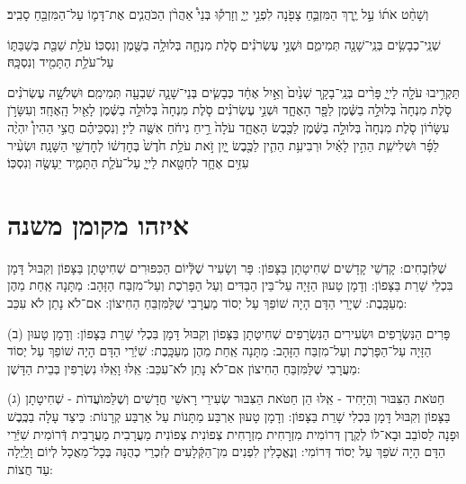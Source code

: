  וְשָׁחַ֨ט  אֹת֜וֹ עַ֣ל יֶ֧רֶךְ הַמִּזְבֵּ֛חַ צָפֹ֖נָה לִפְנֵ֣י יְיָ֑ וְזָרְק֡וּ בְּנֵי֩ אַהֲרֹ֨ן הַכֹּהֲנִ֧ים אֶת־דָּמ֛וֹ עַל־הַמִּזְבֵּ֖חַ סָבִֽיב׃ 
 
 שְׁנֵֽי־כְבָשִׂ֥ים בְּנֵֽי־שָׁנָ֖ה תְּמִימִ֑ם וּשְׁנֵ֣י עֶשְׂרֹנִ֗ים סֹ֧לֶת מִנְחָ֛ה בְּלוּלָ֥ה בַשֶּׁ֖מֶן וְנִסְכּֽוֹ׃ 
 עֹלַ֥ת שַׁבַּ֖ת בְּשַׁבַּתּ֑וֹ עַל־עֹלַ֥ת הַתָּמִ֖יד וְנִסְכָּֽהּ׃ 
 
 
תַּקְרִ֥יבוּ עֹלָ֖ה לַייָ֑ פָּרִ֨ים בְּנֵֽי־בָקָ֤ר שְׁנַ֙יִם֙ וְאַ֣יִל אֶחָ֔ד כְּבָשִׂ֧ים בְּנֵי־שָׁנָ֛ה שִׁבְעָ֖ה תְּמִימִֽם׃ 
וּשְׁלֹשָׁ֣ה עֶשְׂרֹנִ֗ים סֹ֤לֶת מִנְחָה֙ בְּלוּלָ֣ה בַשֶּׁ֔מֶן לַפָּ֖ר הָאֶחָ֑ד וּשְׁנֵ֣י עֶשְׂרֹנִ֗ים סֹ֤לֶת מִנְחָה֙ בְּלוּלָ֣ה בַשֶּׁ֔מֶן לָאַ֖יִל הָֽאֶחָֽד׃ 
וְעִשָּׂרֹ֣ן עִשָּׂר֗וֹן סֹ֤לֶת מִנְחָה֙ בְּלוּלָ֣ה בַשֶּׁ֔מֶן לַכֶּ֖בֶשׂ הָאֶחָ֑ד עֹלָה֙ רֵ֣יחַ נִיחֹ֔חַ אִשֶּׁ֖ה לַייָ׃ 
וְנִסְכֵּיהֶ֗ם חֲצִ֣י הַהִין֩ יִהְיֶ֨ה לַפָּ֜ר וּשְׁלִישִׁ֧ת הַהִ֣ין לָאַ֗יִל וּרְבִיעִ֥ת הַהִ֛ין לַכֶּ֖בֶשׂ יָ֑יִן זֹ֣את עֹלַ֥ת חֹ֙דֶשׁ֙ בְּחׇדְשׁ֔וֹ לְחׇדְשֵׁ֖י הַשָּׁנָֽה׃ 
וּשְׂעִ֨יר עִזִּ֥ים אֶחָ֛ד לְחַטָּ֖את לַייָ֑ עַל־עֹלַ֧ת הַתָּמִ֛יד יֵעָשֶׂ֖ה וְנִסְכּֽוֹ׃ 

\section{איזהו מקומן \quad \textendash \quad משנה}


%
שֶׁלִּזְבָחִים: קָדְשֵׁי קָדָשִׁים שְׁחִיטָתָן בַּצָּפוֹן: פָּר וְשָׂעִיר שֶׁלְּֿיוֹם הַכִּפּוּרִים שְׁחִיטָתָן בַּצָּפוֹן וְקִבּוּל דָּמָן בִּכְלֵי שָׁרֵת בַּצָּפוֹן: וְדָמָן טָעוּן הַזָּיָה עַל־בֵּין הַבַּדִּים וְעַל הַפָּרֹֽכֶת וְעַל־מִזְבַּח הַזָּהָב: מַתָּנָה אַֽחַת מֵהֶן מְעַכָּֽבֶת: שְׁיָרֵי הַדָּם הָיָה שׁוֹפֵךְ עַל יְסוֹד מַעֲרָבִי שֶׁלַּמִּזְבֵּחַ הַחִיצוֹן: אִם־לֹא נָתַן לֹא עִכֵּב:

(ב) פָּרִים הַנִּשְׂרָפִים וּשְׂעִירִים הַנִּשְׂרָפִים שְׁחִיטָתָן בַּצָּפוֹן וְקִבּוּל דָּמָן בִּכְלִי שָׁרֵת בַּצָּפוֹן: וְדָמָן טָעוּן הַזָּיָה עַל־הַפָּרֹֽכֶת וְעַל־מִזְבַּח הַזָּהָב: מַתָּנָה אַֽחַת מֵהֶן מְעַכָּֽבֶת: שִׁיְֿרֵי הַדָּם הָיָה שׁוֹפֵךְ עַל יְסוֹד מַעֲרָבִי שֶׁלַּמִּזְבֵּחַ הַחִיצוֹן אִם־לֹא נָתַן לֹא־עִכֵּב: אֵֽלּוּ וָאֵֽלּוּ נִשְׂרָפִין בְּבֵית הַדָּשֶׁן: 
 
(ג) חַטֹּאת הַצִּבּוּר וְהַיָּחִיד - אֵֽלּוּ הֵן חַטֹּאת הַצִּבּוּר שְׂעִירֵי רָאשֵׁי חֳדָשִׁים וְשֶׁלַּמּוׁעֲדוׂת - שְׁחִיטָתָן בַּצָּפוֹן וְקִבּוּל דָּמָן בִּכְלִי שָׁרֵת בַּצָּפוֹן: וְדָמָן טָעוּן אַרְבַּע מַתָּנוֹת עַל אַרְבַּע קְרָנוֹת: כֵּיצַד עָלָה בַכֶּֽבֶשׁ וּפָנָה לַסּוֹבֵב וּבָא־לוֹ לְקֶֽרֶן דְּרוֹמִית מִזְרָחִית מִזְרָחִית צְפוֹנִית צְפוֹנִית מַעֲרָבִית מַעֲרָבִית דְּֿרוֹמִית שִׁיְּֿרֵי הַדָּם הָיָה שֹׁפֵךְ עַל יְסוֹד דְּרוֹמִי: וְנֶאֱכָלִין לִפְנִים מִן־הַקְּֿלָעִים לְזִכְרֵי כְהֻנָּה בְּכָל־מַאֲכָל לְיוֹם וָלַֽיְלָה עַד חֲצוֹת:

